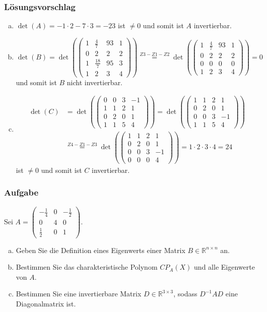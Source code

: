 \documentclass[a4paper,11pt]{scrartcl}
\newcounter{auf}
\newcommand{\Aufgabe}%
        {\addtocounter{auf}{1} \subsubsection*{\rmfamily  Aufgabe \theauf \hspace{1em}} }
\newcommand{\RR}{\mathbb{R}}
\begin{document}
\subsubsection*{Lösungsvorschlag}
\begin{enumerate}[a)]
\item $\det(A)=-1\cdot 2 - 7\cdot 3=-23$ ist $\neq 0$ und somit ist $A$ invertierbar.
\item $\det(B)=\det(\begin{pmatrix} 1 & \frac{4}{7} & 93 &1\\ 0 & 2 & 2 &2 \\1 & \frac{18}{7} & 95 &3 \\ 1& 2 &3 &4\end{pmatrix})\stackrel{Z3-Z1-Z2}{=}\det(\begin{pmatrix} 1 & \frac{4}{7} & 93 &1 \\ 0 & 2 & 2 &2\\0&0&0&0 \\1&2&3&4 \end{pmatrix})=0$ und somit ist $B$ nicht invertierbar.
\item \begin{align*}\det(C)&=\det(\begin{pmatrix}0 & 0& 3 & -1 \\ 1 & 1 &  2 & 1 \\ 0 & 2 & 0 & 1 \\  1 & 1 & 5 & 4 \end{pmatrix})=\det(\begin{pmatrix} 1 & 1 &  2 & 1 \\ 0 & 2 & 0 & 1 \\ 0 & 0& 3 & -1 \\ 1 & 1 & 5 & 4 \end{pmatrix}) \\ &\stackrel{Z4-Z1-Z3}{=}\det(\begin{pmatrix} 1 & 1 &  2 & 1 \\ 0 & 2 & 0 & 1 \\ 0 & 0& 3 & -1 \\ 0 & 0 & 0 & 4 \end{pmatrix})=1\cdot2\cdot3\cdot4=24
\end{align*} ist $\neq 0$ und somit ist $C$ invertierbar.
\end{enumerate}

\newpage
\Aufgabe
Sei $A=\begin{pmatrix} -\frac{1}{4} & 0 & -\frac{1}{2} \\ 0 & 4 & 0 \\ \frac{1}{2} & 0 &1 \end{pmatrix}$. 
\begin{enumerate}[a)]
\item Geben Sie die Definition eines Eigenwerts einer Matrix $B \in \RR^{n\times n}$ an.
\item Bestimmen Sie das charakteristische Polynom $CP_A(X)$ und alle Eigenwerte von $A$.
\item Bestimmen Sie eine invertierbare Matrix $D \in \RR^{3 \times 3}$, sodass $D^{-1}AD$ eine Diagonalmatrix ist.
\end{enumerate}
%
%
\end{document}
